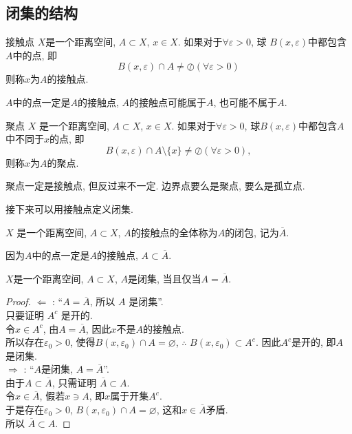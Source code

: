 \documentclass[lang=cn,10pt]{gorgeousnbook}
\numberwithin{equation}{section}%
\numberwithin{figure}{section}%
\begin{document}
\subsection{闭集的结构}
\begin{definition}{接触点}
$X$是一个距离空间, $A\subset X$, $x\in X$. 如果对于$\forall \varepsilon >0$, 球 $B\left(x,\varepsilon \right)$中都包含$A$中的点, 即
\begin{equation}
B\left( x,\varepsilon \right) \cap A\ne \oslash \left( \forall \varepsilon >0 \right) 
\end{equation}
则称$x$为$A$的接触点. 
\end{definition}
\begin{note}
$A$中的点一定是$A$的接触点, $A$的接触点可能属于$A$, 也可能不属于$A$.
\end{note}
\begin{definition}{聚点}
$X$ 是一个距离空间, $A\subset X$, $x\in X$. 如果对于$\forall \varepsilon >0$, 球$B\left(x,\varepsilon \right)$中都包含$A$中不同于$x$的点, 即
\begin{equation}
B\left( x,\varepsilon \right) \cap A\setminus \{x\} \ne \oslash \left( \forall \varepsilon >0 \right) ,
\end{equation}
则称$x$为$A$的聚点. 
\end{definition}

\begin{note}
聚点一定是接触点, 但反过来不一定. 边界点要么是聚点, 要么是孤立点. 
\end{note}

接下来可以用接触点定义闭集. 
\begin{definition}
$X$ 是一个距离空间, $A\subset X$, $A$的接触点的全体称为$A$的闭包, 记为$\overline{A}$.
\end{definition}
\begin{note}
因为$A$中的点一定是$A$的接触点, $A\subset \overline{A}$. 
\end{note}
\begin{theorem}
$X$是一个距离空间, $A\subset X$, $A$是闭集, 当且仅当$A = \overline{A}$.
\end{theorem}
\begin{proof}
$\Leftarrow$ : ``$A = \overline{A}$, 所以 $A$ 是闭集''. \\
只要证明 $A^c$ 是开的.\\
令$x\in A^c$, 由$A = \overline{A}$, 因此$x$不是$A$的接触点.\\
所以存在$\varepsilon_0 > 0$, 使得$B(x,\varepsilon_0)\cap A = \varnothing$, $\therefore $ $B(x,\varepsilon_0)\subset A^c$. 因此$A^c$是开的, 即$A$是闭集. \\
$\Rightarrow$ : ``$A$是闭集, $A = \overline{A}$''. \\
由于$A\subset  \overline{A} $, 只需证明 $\overline{A}\subset  A$.\\
令$x \in \overline{A}$, 假若$x\ni A$, 即$x$属于开集$A^c$.\\
于是存在$\varepsilon_0 > 0$, $B(x,\varepsilon_0)\cap A = \varnothing$, 这和$x\in \overline{A}$矛盾. \\
所以  $\overline{A}\subset  A$.
\end{proof}
\end{document}
